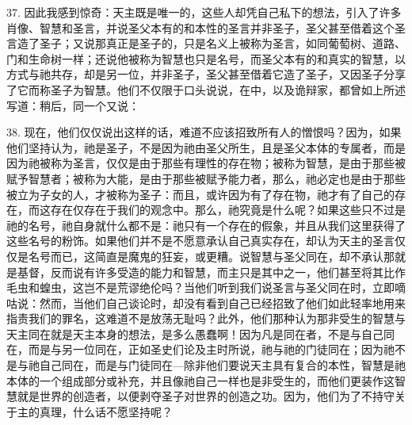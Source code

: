 37. 因此我感到惊奇：天主既是唯一的，这些人却凭自己私下的想法，引入了许多肖像、智慧和圣言，并说圣父本有的和本性的圣言并非圣子，圣父甚至借着这个圣言造了圣子；又说那真正是圣子的，只是名义上被称为圣言，如同葡萄树、道路、门和生命树一样；还说他被称为智慧也只是名号，而圣父本有的和真实的智慧，以方式与祂共存，却是另一位，并非圣子，圣父甚至借着它造了圣子，又因圣子分享了它而称圣子为智慧。他们不仅限于口头说说，在中，以及诡辩家，都曾如上所述写道：稍后，同一个又说：\par

38. 现在，他们仅仅说出这样的话，难道不应该招致所有人的憎恨吗？因为，如果他们坚持认为，祂是圣子，不是因为祂由圣父所生，且是圣父本体的专属者，而是因为祂被称为圣言，仅仅是由于那些有理性的存在物；被称为智慧，是由于那些被赋予智慧者；被称为大能，是由于那些被赋予能力者，那么，祂必定也是由于那些被立为子女的人，才被称为圣子：而且，或许因为有了存在物，祂才有了自己的存在，而这存在仅存在于我们的观念中。那么，祂究竟是什么呢？如果这些只不过是祂的名号，祂自身就什么都不是：祂只有一个存在的假象，并且从我们这里获得了这些名号的粉饰。如果他们并不是不愿意承认自己真实存在，却认为天主的圣言仅仅是名号而已，这简直是魔鬼的狂妄，或更糟。说智慧与圣父同在，却不承认那就是基督，反而说有许多受造的能力和智慧，而主只是其中之一，他们甚至将其比作毛虫和蝗虫，这岂不是荒谬绝伦吗？当他们听到我们说圣言与圣父同在时，立即嘀咕说：然而，当他们自己谈论时，却没有看到自己已经招致了他们如此轻率地用来指责我们的罪名，这难道不是放荡无耻吗？此外，他们那种认为那非受生的智慧与天主同在就是天主本身的想法，是多么愚蠢啊！因为凡是同在者，不是与自己同在，而是与另一位同在，正如圣史们论及主时所说，祂与祂的门徒同在；因为祂不是与祂自己同在，而是与门徒同在---除非他们要说天主具有复合的本性，智慧是祂本体的一个组成部分或补充，并且像祂自己一样也是非受生的，而他们更装作这智慧就是世界的创造者，以便剥夺圣子对世界的创造之功。因为，他们为了不持守关于主的真理，什么话不愿坚持呢？\par

